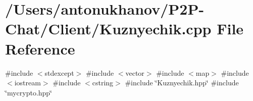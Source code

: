 \section{/\+Users/antonukhanov/\+P2\+P-\/\+Chat/\+Client/\+Kuznyechik.cpp File Reference}
\label{_kuznyechik_8cpp}
{\ttfamily \#include $<$stdexcept$>$}\newline
{\ttfamily \#include $<$vector$>$}\newline
{\ttfamily \#include $<$map$>$}\newline
{\ttfamily \#include $<$iostream$>$}\newline
{\ttfamily \#include $<$cstring$>$}\newline
{\ttfamily \#include \char`\"{}Kuznyechik.\+hpp\char`\"{}}\newline
{\ttfamily \#include \char`\"{}mycrypto.\+hpp\char`\"{}}\newline
